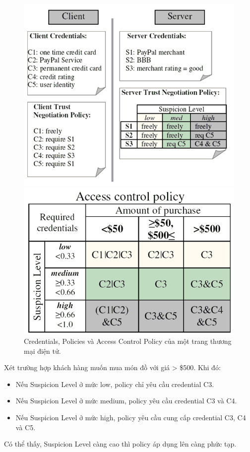 \documentclass[12pt]{article}
\begin{document}
\begin{figure}[H]
\centering
\begin{multicols}{2}
\includegraphics[scale=.5]{img/atnac-example-1.png}

\includegraphics[scale=.5]{img/atnac-example-2.png}
\end{multicols}
\caption{Credentials, Policies và Access Control Policy của một trang thương mại điện tử.}
\end{figure}

Xét trường hợp khách hàng muốn mua món đồ với giá > \$500. Khi đó:
\begin{itemize}
\item Nếu Suspicion Level ở mức low, policy chỉ yêu cầu credential C3.
\item Nếu Suspicion Level ở mức medium, policy yêu cầu credential C3 và C4.
\item Nếu Suspicion Level ở mức high, policy yêu cầu cung cấp credential C3, C4 và C5.
\end{itemize}
Có thể thấy, Suspicion Level càng cao thì policy áp dụng lên càng phức tạp.
\end{document}
